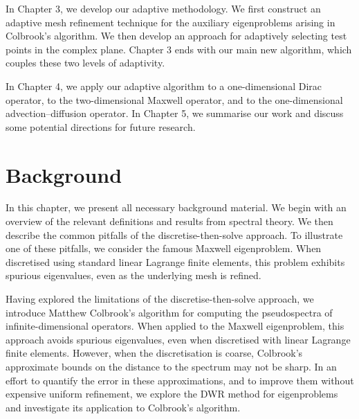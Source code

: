 In Chapter 3, we develop our adaptive methodology. We first construct an adaptive mesh refinement technique for the auxiliary eigenproblems arising in Colbrook's algorithm. We then develop an approach for adaptively selecting test points in the complex plane. Chapter 3 ends with our main new algorithm, which couples these two levels of adaptivity. 

In Chapter 4, we apply our adaptive algorithm to a one-dimensional Dirac operator, to the two-dimensional Maxwell operator, and to the one-dimensional advection--diffusion operator. In Chapter 5, we summarise our work and discuss some potential directions for future research.
















\chapter{Background}


In this chapter, we present all necessary background material. We begin with an overview of the relevant definitions and results from spectral theory. We then describe the common pitfalls of the discretise-then-solve approach. To illustrate one of these pitfalls, we consider the famous Maxwell eigenproblem. When discretised using standard linear Lagrange finite elements, this problem exhibits spurious eigenvalues, even as the underlying mesh is refined. 

Having explored the limitations of the discretise-then-solve approach, we introduce Matthew Colbrook's algorithm for computing the pseudospectra of infinite-dimensional operators. When applied to the Maxwell eigenproblem, this approach avoids spurious eigenvalues, even when discretised with linear Lagrange finite elements. 
However, when the discretisation is coarse, Colbrook's 
approximate bounds on the distance to the spectrum may not be sharp. 
In an effort to quantify the error in these approximations, and to improve them without expensive uniform refinement, we explore the DWR method for eigenproblems and investigate its application to Colbrook's algorithm. 



